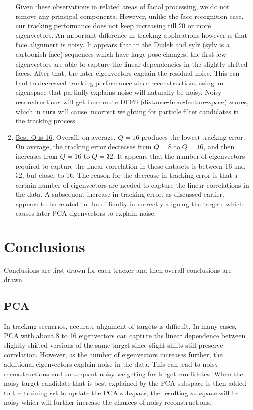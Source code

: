 \begin{enumerate}
Given these observations in related areas of facial processing, we do not remove any principal components.  However, unlike the face recognition case, our tracking performance does not keep increasing till 20 or more eigenvectors.  An important difference in tracking applications however is that face alignment is noisy.  It appears that in the Dudek and sylv (sylv is a cartoonish face) sequences which have large pose changes, the first few eigenvectors are able to capture the linear dependencies in the slightly shifted faces.  After that, the later eigenvectors explain the residual noise.  This can lead to decreased tracking performance since reconstructions using an eigenspace that partially explains noise will naturally be noisy.  Noisy reconstructions will get inaccurate DFFS (distance-from-feature-space) scores, which in turn will cause incorrect weighting for particle filter candidates in the tracking process.
\item \underline{Best Q is 16}.  Overall, on average, $Q=16$ produces the lowest tracking error.  On average, the tracking error decreases from $Q=8$ to $Q=16$, and then increases from $Q=16$ to $Q=32$.  It appears that the number of eigenvectors required to capture the linear correlation in these datasets is between 16 and 32, but closer to 16.   
The reason for the decrease in tracking error is that a certain number of eigenvectors are needed to capture the linear correlations in the data.  A subsequent increase in tracking error, as discussed earlier, appears to be related to the difficulty in correctly aligning the targets which causes later PCA eigenvectors to explain noise.
\end{enumerate}

\section{Conclusions}
Conclusions are first drawn for each tracker and then overall conclusions are drawn.

\subsection{PCA}
In tracking scenarios, accurate alignment of targets is difficult.  In many cases, PCA with about 8 to 16 eigenvectors can capture the linear dependence between slightly shifted versions of the same target since slight shifts still preserve correlation.  However, as the number of eigenvectors increases further, the additional eigenvectors explain noise in the data.  This can lead to noisy reconstructions and subsequent noisy weighting for target candidates.  When the noisy target candidate that is best explained by the PCA subspace is then added to the training set to update the PCA subspace, the resulting subspace will be noisy which will further increase the chances of noisy reconstructions.  

